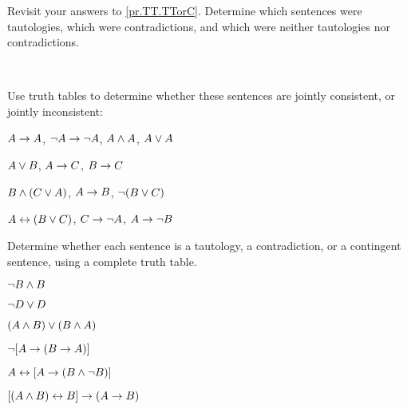 \begin{practiceproblems}
	\problempart
	Revisit your answers to \ref{pr.TT.TTorC}. Determine which sentences were tautologies, which were contradictions, and which were neither tautologies nor contradictions.
	\solutions
	
	\
	
	\problempart
	\label{pr.TT.consistent}
	Use truth tables to determine whether these sentences are jointly consistent, or jointly inconsistent:
	\begin{earg}
		\item $A\rightarrow A$, $\neg A \rightarrow \neg A$, $A\mathbin{\wedge} A$, $A\vee A$ %
		\item $A\vee B$, $A\rightarrow C$, $B\rightarrow C$ %
		\item $B\mathbin{\wedge}(C\vee A)$, $A\rightarrow B$, $\neg(B\vee C)$  %
		\item $A\leftrightarrow(B\vee C)$, $C\rightarrow \neg A$, $A\rightarrow \neg B$ %
	\end{earg}
	
	
	
	\problempart Determine whether each sentence is a tautology, a contradiction, or a contingent sentence, using a complete truth table.
	\begin{earg}
		\item $\neg B \mathbin{\wedge} B$ \vspace{.5ex}%
		
		
		\item $\neg D \vee D$ \vspace{.5ex}%
		
		
		\item $(A\mathbin{\wedge} B) \vee (B\mathbin{\wedge} A)$\vspace{.5ex} %
		
		
		\item $\neg[A \rightarrow (B \rightarrow A)]$\vspace{.5ex} %
		
		
		\item $A \leftrightarrow [A \rightarrow (B \mathbin{\wedge} \neg B)]$ \vspace{.5ex}%
		
		
		\item $[(A \mathbin{\wedge} B) \leftrightarrow B] \rightarrow (A \rightarrow B)$ \vspace{.5ex}%
		
	\end{earg}
	
	
	

\end{practiceproblems}
